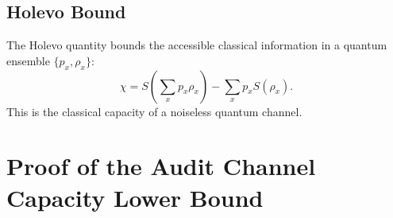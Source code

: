 \documentclass[11pt,a4paper]{article}
\theoremstyle{plain}
\theoremstyle{definition}
\theoremstyle{remark}
\begin{document}
\subsection{Holevo Bound}

The Holevo quantity bounds the accessible classical information in
a quantum ensemble $\{p_x, \rho_x\}$:
\[
\chi = S\left(\sum_x p_x \rho_x\right) - \sum_x p_x S(\rho_x).
\]
This is the classical capacity of a noiseless quantum channel.

\section{Proof of the Audit Channel Capacity Lower Bound}
\label{app:proof}
\end{document}
